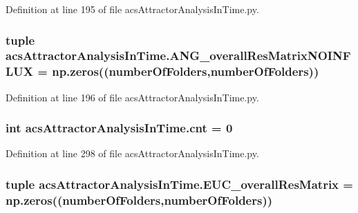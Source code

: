 Definition at line 195 of file acs\-Attractor\-Analysis\-In\-Time.\-py.

\hypertarget{a00097_a7b0e67be0cf8de69432bdf56919d9e33}{
\subsubsection[{A\-N\-G\-\_\-overall\-Res\-Matrix\-N\-O\-I\-N\-F\-L\-U\-X}]{\setlength{\rightskip}{0pt plus 5cm}tuple acs\-Attractor\-Analysis\-In\-Time.\-A\-N\-G\-\_\-overall\-Res\-Matrix\-N\-O\-I\-N\-F\-L\-U\-X = np.\-zeros(({\bf number\-Of\-Folders},{\bf number\-Of\-Folders}))}}\label{a00097_a7b0e67be0cf8de69432bdf56919d9e33}


Definition at line 196 of file acs\-Attractor\-Analysis\-In\-Time.\-py.

\hypertarget{a00097_aabada0bdbcd7fb71d37a9310d32f0a28}{
\subsubsection[{cnt}]{\setlength{\rightskip}{0pt plus 5cm}int acs\-Attractor\-Analysis\-In\-Time.\-cnt = 0}}\label{a00097_aabada0bdbcd7fb71d37a9310d32f0a28}


Definition at line 298 of file acs\-Attractor\-Analysis\-In\-Time.\-py.

\hypertarget{a00097_a63ee1925f76a40d04495e9b35c0973d2}{
\subsubsection[{E\-U\-C\-\_\-overall\-Res\-Matrix}]{\setlength{\rightskip}{0pt plus 5cm}tuple acs\-Attractor\-Analysis\-In\-Time.\-E\-U\-C\-\_\-overall\-Res\-Matrix = np.\-zeros(({\bf number\-Of\-Folders},{\bf number\-Of\-Folders}))}}\label{a00097_a63ee1925f76a40d04495e9b35c0973d2}



